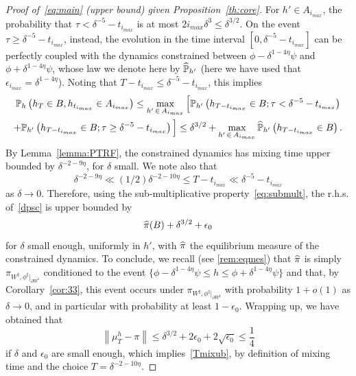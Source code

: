 \documentclass[AHL,Unicode,longabstracts,published]{cedram}
\renewcommand{\P}{\mathbb{P}}
\renewcommand{\d}{{\sharp }}
\let\oldhat\hat
\renewcommand*{\hat}[1]{\mathchoice{\widehat{#1}}{\widehat{#1}}{\oldhat{#1}}{\oldhat{#1}}}
\begin{document}
\begin{proof}[Proof of~\eqref{eq:main} (upper bound) given Proposition~\ref{th:core}]
For $h'\in A_{i_{max}}$, the probability that $\tau< \delta^{-5}-t_{i_{max}}$ is at most $2i_{max}\delta^3\leq \delta^{3/2}$. On the event $\tau\ge \delta^{-5}-t_{i_{max}}$, instead, the evolution in the time interval $[0,\delta^{-5}-t_{i_{max}}]$ can be perfectly coupled with the dynamics constrained between $\phi-\delta^{1-4\eta}\psi$ and $\phi+\delta^{1-4\eta}\psi$, whose law we denote here by $\hat\P_{h'}$ (here we have used that $\epsilon_{i_{max}}=\delta^{1-4\eta}$). Noting that $T-t_{i_{max}}\le \delta^{-5}-t_{i_{max}}$, this implies
\begin{multline}\label{dpsc}
\P_h\left(h_T\in B, h_{t_{i_{max}}} \in A_{i_{max}}\right) 
\le \max_{h'\,\in\,A_{i_{max}}}\Big[\P_{h'}\left(h_{T-t_{i_{max}}}\in B;\tau< \delta^{-5}-t_{i_{max}}\right)\\
+\P_{h'}\left(h_{T-t_{i_{max}}}\in B;\tau\geq \delta^{-5}-t_{i_{max}}\right)\Big]
\le \delta^{3/2}+ \max_{h'\,\in\,A_{i_{max}}}\hat\P_{h'}\left(h_{T-t_{i_{max}}}\in B\right).
\end{multline}
By Lemma~\ref{lemma:PTRF}, the constrained dynamics has mixing time upper bounded by $\delta^{-2-9\eta}$, for $\delta$ small. We note also that
\begin{equation}
\delta^{-2-9\eta}\ll (1/2)\delta^{-2-10\eta}\le T-t_{i_{max}}\ll \delta^{-5}-t_{i_{max}}
\end{equation}
as $\delta\to0$. Therefore, using the sub-multiplicative property~\eqref{eq:submult}, the r.h.s. of~\eqref{dpsc} is upper bounded by
\begin{equation}
\hat \pi(B)+\delta^{3/2}+\epsilon_0
\end{equation}
for $\delta$ small enough, uniformly in $h'$, with $\hat\pi$ the equilibrium measure of the constrained dynamics. To conclude, we recall (see \eqref{rem:eqmes}) that $\hat\pi$ is simply $\pi_{W^\d,\phi^\d|_{\partial W^\d}}$ conditioned to the event $\{\phi-\delta^{1-4\eta}\psi\le h\le \phi+\delta^{1-4\eta}\psi\}$ and that, by
Corollary~\ref{cor:33}, this event occurs under $\pi_{W^\d,\phi^\d|_{\partial W^\d}}$ with probability $1+o(1)$ as $\delta\to0$, and in particular with probability at least $1-\epsilon_0$. Wrapping up, we have obtained that
\begin{equation}
\left\|\mu_T^h-\pi\right\|\le \delta^{3/2}+2\epsilon_0 + 2 \sqrt{\epsilon_0} \le \frac14
\end{equation}
if $\delta$ and $ \epsilon_0$ are small enough, which implies~\eqref{Tmixub}, by definition of mixing time and the choice $T=\delta^{-2-10\eta}$.
\end{proof}
\end{document}
